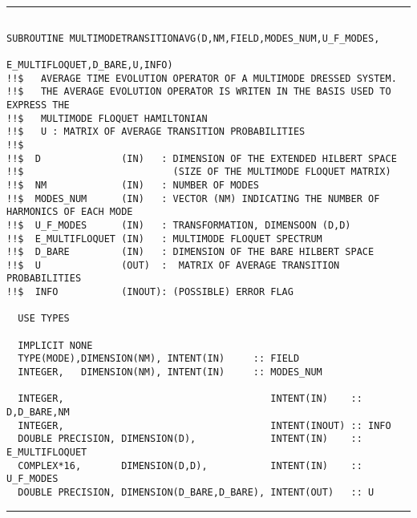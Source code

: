 \documentclass[10pt,a4paper]{article}
\begin{document}
\begin{center}
\rule{12cm}{1pt}
\end{center}
\begin{verbatim}

SUBROUTINE MULTIMODETRANSITIONAVG(D,NM,FIELD,MODES_NUM,U_F_MODES,
                                              E_MULTIFLOQUET,D_BARE,U,INFO) 
!!$   AVERAGE TIME EVOLUTION OPERATOR OF A MULTIMODE DRESSED SYSTEM. 
!!$   THE AVERAGE EVOLUTION OPERATOR IS WRITEN IN THE BASIS USED TO EXPRESS THE 
!!$   MULTIMODE FLOQUET HAMILTONIAN
!!$   U : MATRIX OF AVERAGE TRANSITION PROBABILITIES
!!$
!!$  D              (IN)   : DIMENSION OF THE EXTENDED HILBERT SPACE 
!!$                          (SIZE OF THE MULTIMODE FLOQUET MATRIX)
!!$  NM             (IN)   : NUMBER OF MODES            
!!$  MODES_NUM      (IN)   : VECTOR (NM) INDICATING THE NUMBER OF HARMONICS OF EACH MODE
!!$  U_F_MODES      (IN)   : TRANSFORMATION, DIMENSOON (D,D) 
!!$  E_MULTIFLOQUET (IN)   : MULTIMODE FLOQUET SPECTRUM
!!$  D_BARE         (IN)   : DIMENSION OF THE BARE HILBERT SPACE
!!$  U              (OUT)  :  MATRIX OF AVERAGE TRANSITION PROBABILITIES
!!$  INFO           (INOUT): (POSSIBLE) ERROR FLAG

  USE TYPES

  IMPLICIT NONE
  TYPE(MODE),DIMENSION(NM), INTENT(IN)     :: FIELD
  INTEGER,   DIMENSION(NM), INTENT(IN)     :: MODES_NUM

  INTEGER,                                    INTENT(IN)    :: D,D_BARE,NM 
  INTEGER,                                    INTENT(INOUT) :: INFO
  DOUBLE PRECISION, DIMENSION(D),             INTENT(IN)    :: E_MULTIFLOQUET 
  COMPLEX*16,       DIMENSION(D,D),           INTENT(IN)    :: U_F_MODES   
  DOUBLE PRECISION, DIMENSION(D_BARE,D_BARE), INTENT(OUT)   :: U           

\end{verbatim}
\begin{center}
\rule{12cm}{1pt}
\end{center}
\newpage
\end{document}
